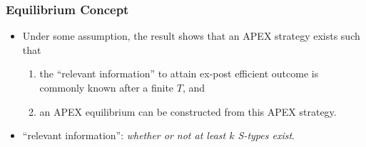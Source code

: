 \documentclass[8pt]{beamer}
\begin{document}
\begin{frame}
  \frametitle{Equilibrium Concept}


\begin{itemize}
\item Under some assumption, the result shows that an APEX strategy exists such that
\begin{enumerate}
\item the ``relevant information'' to attain ex-post efficient outcome is commonly known after a finite $T$, and
\item an APEX equilibrium can be constructed from this APEX strategy.
\end{enumerate}

\item ``relevant information'': \textit{whether or not at least $k$ S-types exist}.

\end{itemize}
\end{frame}
\end{document}
